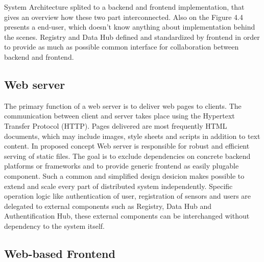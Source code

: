     System Architecture splited to a backend and frontend implementation, that gives an overview how these two part interconnected. Also on the Figure 4.4 presents a end-user, which doesn't know anything about implementation behind the scenes. Registry and Data Hub defined and standardized by frontend in order to provide as much as possible common interface for collaboration between backend and frontend. 

	\subsection{Web server}
  The primary function of a web server is to deliver web pages to clients. The communication between client and server takes place using the Hypertext Transfer Protocol (HTTP). Pages delivered are most frequently HTML documents, which may include images, style sheets and scripts in addition to text content. 
  \newline 
  In proposed concept Web server is responsible for robust and efficient serving of static files. The goal is to exclude dependencies on concrete backend platforms or frameworks and to provide generic frontend as easily plugable component. Such a common and simplified design desicion makes possible to extend and scale every part of distributed system independently. Specific operation logic like authentication of user, registration of sensors and users are delegated to external components such as Registry, Data Hub and Authentification Hub, these external components can be interchanged without dependency to the system itself.

  \subsection{Web-based Frontend}
